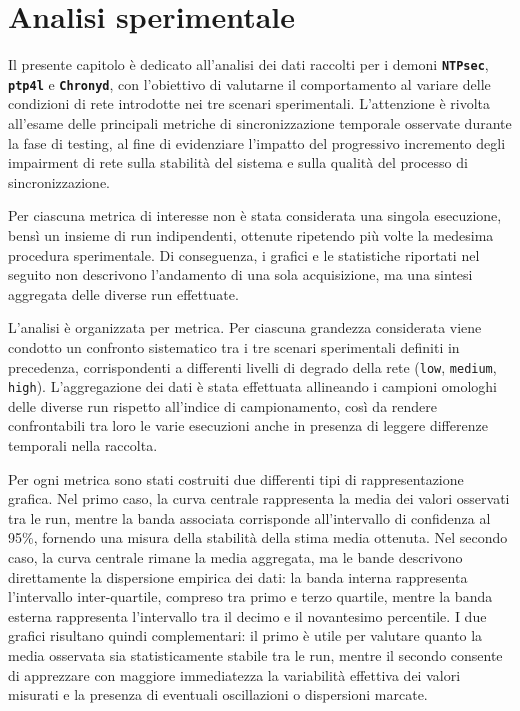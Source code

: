\chapter{Analisi sperimentale}
\label{cha:AnalisiSperimentale}

Il presente capitolo è dedicato all'analisi dei dati raccolti per i demoni
\texttt{\textbf{NTPsec}}, \texttt{\textbf{ptp4l}} e \texttt{\textbf{Chronyd}}, con
l'obiettivo di valutarne il comportamento al variare delle condizioni di rete introdotte
nei tre scenari sperimentali. L'attenzione è rivolta all'esame delle principali
metriche di sincronizzazione temporale osservate durante la fase di testing, al fine
di evidenziare l'impatto del progressivo incremento degli impairment di rete sulla
stabilità del sistema e sulla qualità del processo di sincronizzazione.

Per ciascuna metrica di interesse non è stata considerata una singola esecuzione,
bensì un insieme di run indipendenti, ottenute ripetendo più volte la medesima procedura
sperimentale. Di conseguenza, i grafici e le statistiche riportati nel seguito non
descrivono l'andamento di una sola acquisizione, ma una sintesi aggregata delle
diverse run effettuate.

L'analisi è organizzata per metrica. Per ciascuna grandezza considerata viene condotto
un confronto sistematico tra i tre scenari sperimentali definiti in precedenza,
corrispondenti a differenti livelli di degrado della rete (\texttt{low}, \texttt{medium},
\texttt{high}). L'aggregazione dei dati è stata effettuata allineando i campioni
omologhi delle diverse run rispetto all'indice di campionamento, così da rendere confrontabili
tra loro le varie esecuzioni anche in presenza di leggere differenze temporali nella
raccolta.

Per ogni metrica sono stati costruiti due differenti tipi di rappresentazione grafica.
Nel primo caso, la curva centrale rappresenta la media dei valori osservati tra le
run, mentre la banda associata corrisponde all'intervallo di confidenza al 95\%,
fornendo una misura della stabilità della stima media ottenuta. Nel secondo caso,
la curva centrale rimane la media aggregata, ma le bande descrivono direttamente la
dispersione empirica dei dati: la banda interna rappresenta l'intervallo
inter-quartile, compreso tra primo e terzo quartile, mentre la banda esterna
rappresenta l'intervallo tra il decimo e il novantesimo percentile. I due grafici
risultano quindi complementari: il primo è utile per valutare quanto la media
osservata sia statisticamente stabile tra le run, mentre il secondo consente di apprezzare
con maggiore immediatezza la variabilità effettiva dei valori misurati e la presenza
di eventuali oscillazioni o dispersioni marcate.


